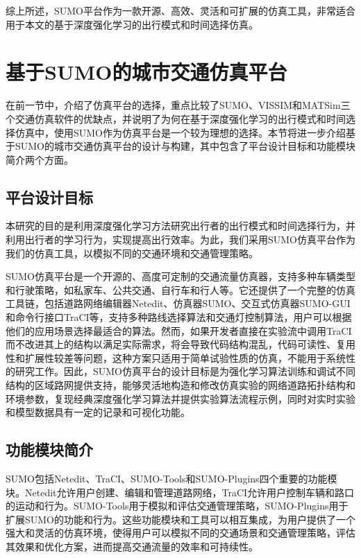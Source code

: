 综上所述，SUMO平台作为一款开源、高效、灵活和可扩展的仿真工具，非常适合用于本文的基于深度强化学习的出行模式和时间选择仿真。


\section{基于SUMO的城市交通仿真平台}

在前一节中，介绍了仿真平台的选择，重点比较了SUMO、VISSIM和MATSim三个交通仿真软件的优缺点，并说明了为何在基于深度强化学习的出行模式和时间选择仿真中，使用SUMO作为仿真平台是一个较为理想的选择。本节将进一步介绍基于SUMO的城市交通仿真平台的设计与构建，其中包含了平台设计目标和功能模块简介两个方面。

\subsection{平台设计目标}


本研究的目的是利用深度强化学习方法研究出行者的出行模式和时间选择行为，并利用出行者的学习行为，实现提高出行效率。为此，我们采用SUMO仿真平台作为我们的仿真工具，以模拟不同的交通环境和交通管理策略。

SUMO仿真平台是一个开源的、高度可定制的交通流量仿真器，支持多种车辆类型和行驶策略，如私家车、公共交通、自行车和行人等。它还提供了一个完整的仿真工具链，包括道路网络编辑器Netedit、仿真器SUMO、交互式仿真器SUMO-GUI和命令行接口TraCI等，支持多种路线选择算法和交通灯控制算法，用户可以根据他们的应用场景选择最适合的算法。然而，如果开发者直接在实验流中调用TraCI而不改进其上的结构以满足实际需求，将会导致代码结构混乱，代码可读性、复用性和扩展性较差等问题，这种方案只适用于简单试验性质的仿真，不能用于系统性的研究工作。因此，SUMO仿真平台的设计目标是为强化学习算法训练和调试不同结构的区域路网提供支持，能够灵活地构造和修改仿真实验的网络道路拓扑结构和环境参数，复现经典深度强化学习算法并提供实验算法流程示例，同时对实时实验和模型数据具有一定的记录和可视化功能。
 

\subsection{功能模块简介}
SUMO包括Netedit、TraCI、SUMO-Tools和SUMO-Plugins四个重要的功能模块。Netedit允许用户创建、编辑和管理道路网络，TraCI允许用户控制车辆和路口的运动和行为。SUMO-Tools用于模拟和评估交通管理策略，SUMO-Plugins用于扩展SUMO的功能和行为。这些功能模块和工具可以相互集成，为用户提供了一个强大和灵活的仿真环境，使得用户可以模拟不同的交通场景和交通管理策略，评估其效果和优化方案，进而提高交通流量的效率和可持续性。

